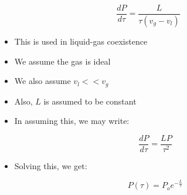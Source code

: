 \begin{itemize}
    $$\frac{dP}{d\tau}=\frac{L}{\tau(v_g-v_l)}$$

    \begin{itemize}

      \item This is used in liquid-gas coexistence

      \item We assume the gas is ideal

      \item We also assume $v_l<<v_g$

      \item Also, $L$ is assumed to be constant

      \item In assuming this, we may write:

        $$\frac{dP}{d\tau}=\frac{LP}{\tau^2}$$

      \item Solving this, we get:

        $$P(\tau)=P_oe^{-\frac{L}{\tau}}$$

    \end{itemize}

\end{itemize}





